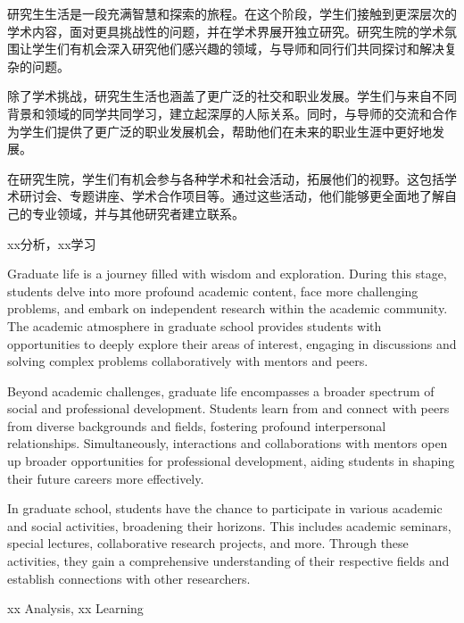 \begin{abstractCN}
\setlength{\baselineskip}{23pt} %


研究生生活是一段充满智慧和探索的旅程。在这个阶段，学生们接触到更深层次的学术内容，面对更具挑战性的问题，并在学术界展开独立研究。研究生院的学术氛围让学生们有机会深入研究他们感兴趣的领域，与导师和同行们共同探讨和解决复杂的问题。

除了学术挑战，研究生生活也涵盖了更广泛的社交和职业发展。学生们与来自不同背景和领域的同学共同学习，建立起深厚的人际关系。同时，与导师的交流和合作为学生们提供了更广泛的职业发展机会，帮助他们在未来的职业生涯中更好地发展。

在研究生院，学生们有机会参与各种学术和社会活动，拓展他们的视野。这包括学术研讨会、专题讲座、学术合作项目等。通过这些活动，他们能够更全面地了解自己的专业领域，并与其他研究者建立联系。


\end{abstractCN}


\begin{keywordCN}
xx分析，xx学习
\end{keywordCN}

\begin{abstractEN}
\setlength{\baselineskip}{23pt} %

Graduate life is a journey filled with wisdom and exploration. During this stage, students delve into more profound academic content, face more challenging problems, and embark on independent research within the academic community. The academic atmosphere in graduate school provides students with opportunities to deeply explore their areas of interest, engaging in discussions and solving complex problems collaboratively with mentors and peers.

Beyond academic challenges, graduate life encompasses a broader spectrum of social and professional development. Students learn from and connect with peers from diverse backgrounds and fields, fostering profound interpersonal relationships. Simultaneously, interactions and collaborations with mentors open up broader opportunities for professional development, aiding students in shaping their future careers more effectively.

In graduate school, students have the chance to participate in various academic and social activities, broadening their horizons. This includes academic seminars, special lectures, collaborative research projects, and more. Through these activities, they gain a comprehensive understanding of their respective fields and establish connections with other researchers.

\end{abstractEN}

\begin{keywordEN}
xx Analysis, xx Learning
\end{keywordEN}

